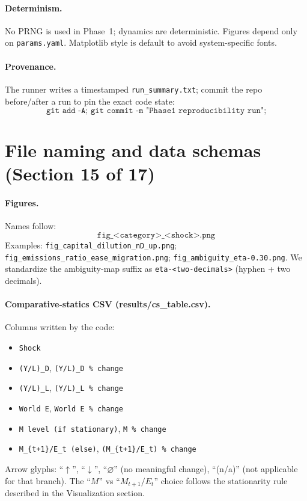 \documentclass[12pt,a4paper]{article}
\newcommand{\code}[1]{\texttt{#1}}
\begin{document}
\paragraph{Determinism.} No PRNG is used in Phase~1; dynamics are deterministic. Figures depend only on \code{params.yaml}. Matplotlib style is default to avoid system-specific fonts.

\paragraph{Provenance.} The runner writes a timestamped \code{run\_summary.txt}; commit the repo before/after a run to pin the exact code state:
\[
\code{git\ add\ -A;\ git\ commit\ -m\ "Phase1 reproducibility run";}
\]



\section{File naming and data schemas (Section 15 of 17)}
\paragraph{Figures.} Names follow:
\[
\code{fig\_<category>\_<shock>.png}
\]
Examples: \code{fig\_capital\_dilution\_nD\_up.png}; \code{fig\_emissions\_ratio\_ease\_migration.png}; \code{fig\_ambiguity\_eta-0.30.png}.
We standardize the ambiguity-map suffix as \code{eta-<two-decimals>} (hyphen + two decimals).

\paragraph{Comparative-statics CSV (results/cs\_table.csv).}
Columns written by the code:
\begin{itemize}[leftmargin=1.25em]
  \item \texttt{Shock}
  \item \texttt{(Y/L)\_D}, \texttt{(Y/L)\_D \% change}
  \item \texttt{(Y/L)\_L}, \texttt{(Y/L)\_L \% change}
  \item \texttt{World E}, \texttt{World E \% change}
  \item \texttt{M level (if stationary)}, \texttt{M \% change}
  \item \texttt{M\_\{t+1\}/E\_t (else)}, \texttt{(M\_\{t+1\}/E\_t) \% change}
\end{itemize}
Arrow glyphs: “\(\uparrow\)”, “\(\downarrow\)”, “\(\varnothing\)” (no meaningful change), “(n/a)” (not applicable for that branch). The “\(M\)” vs “\(M_{t+1}/E_t\)” choice follows the stationarity rule described in the Visualization section.
\end{document}
